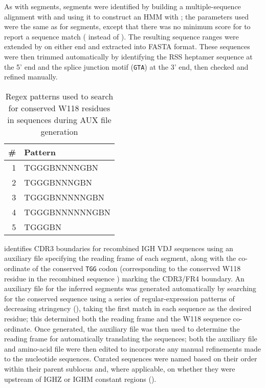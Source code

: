 \subsubsubsection{\jh}

\noindent As with \vh segments, \jh segments were identified by building a multiple-sequence alignment with  and using it to construct an HMM with ; the parameters used were the same as for \vh segments, except that there was no minimum score for  to report a sequence match ( instead of ). The resulting sequence ranges were extended by  on either end and extracted into FASTA format. These sequences were then trimmed automatically by identifying the RSS heptamer sequence at the 5' end and the splice junction motif (\texttt{GTA}) at the 3' end, then checked and refined manually.

\begin{wraptable}{r}{6.5cm}
\caption{Regex patterns used to search for conserved W118 residues in \jh sequences during AUX file generation}\label{tab:jh-aux-patterns}
\begin{tabular}{r>{\ttseries}l}\toprule  
\# & Pattern \\\midrule
1 & TGGGBNNNNGBN\\
2 & TGGGBNNNGBN\\
3 & TGGGBNNNNNGBN\\
4 & TGGGBNNNNNNGBN\\
5 & TGGGBN\\\bottomrule
\end{tabular}
\end{wraptable}

 \parencite{ye2013igblast} identifies CDR3 boundaries for recombined IGH VDJ sequences using an auxiliary file specifying the reading frame of each \jh segment, along with the co-ordinate of the conserved \texttt{TGG} codon (corresponding to the conserved W118 residue in the recombined sequence \parencite{lefranc2014immunoglobulins}) marking the CDR3/FR4 boundary. An auxiliary file for the inferred \jh segments was generated automatically by searching for the conserved sequence using a series of regular-expression patterns of decreasing stringency (), taking the first match in each sequence as the desired residue; this determined both the reading frame and the W118 sequence co-ordinate. Once generated, the auxiliary file was then used to determine the reading frame for automatically translating the \jh sequences; both the auxiliary file and amino-acid  file were then edited to incorporate any manual refinements made to the \jh nucleotide sequences. Curated \jh sequences were named based on their order within their parent sublocus and, where applicable, on whether they were upstream of IGHZ or IGHM constant regions ().

